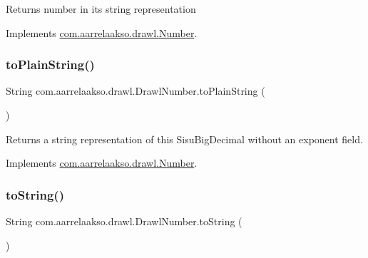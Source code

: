 \begin{DoxyReturn}{Returns}
number in it\textquotesingle{}s string representation 
\end{DoxyReturn}


Implements \hyperlink{interfacecom_1_1aarrelaakso_1_1drawl_1_1_number_accc9efbfff1dfc0ff3d6352e3c1cfd4e}{com.\+aarrelaakso.\+drawl.\+Number}.

\mbox{\label{classcom_1_1aarrelaakso_1_1drawl_1_1_drawl_number_a07c4c1c3a0e81ae9aef3325bef3e0152}} 
\subsubsection{\texorpdfstring{to\+Plain\+String()}{toPlainString()}}
{\footnotesize\ttfamily String com.\+aarrelaakso.\+drawl.\+Drawl\+Number.\+to\+Plain\+String (\begin{DoxyParamCaption}{ }\end{DoxyParamCaption})}

\begin{DoxyReturn}{Returns}
a string representation of this Sisu\+Big\+Decimal without an exponent field. 
\end{DoxyReturn}


Implements \hyperlink{interfacecom_1_1aarrelaakso_1_1drawl_1_1_number_a0c6dd9fbd93fdb6d7e487f507d55ba43}{com.\+aarrelaakso.\+drawl.\+Number}.

\mbox{\label{classcom_1_1aarrelaakso_1_1drawl_1_1_drawl_number_a24775bf5217d477c4b39149596210184}} 
\subsubsection{\texorpdfstring{to\+String()}{toString()}}
{\footnotesize\ttfamily String com.\+aarrelaakso.\+drawl.\+Drawl\+Number.\+to\+String (\begin{DoxyParamCaption}{ }\end{DoxyParamCaption})}



